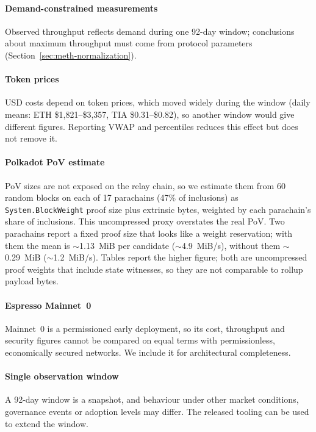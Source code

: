 \paragraph{Demand-constrained measurements}
Observed throughput reflects demand during one 92-day window; conclusions about maximum throughput must come from protocol parameters (Section~\ref{sec:meth-normalization}).

\paragraph{Token prices}
USD costs depend on token prices, which moved widely during the window (daily means: ETH \$1,821--\$3,357, TIA \$0.31--\$0.82), so another window would give different figures.
Reporting VWAP and percentiles reduces this effect but does not remove it.

\paragraph{Polkadot PoV estimate}
PoV sizes are not exposed on the relay chain, so we estimate them from 60 random blocks on each of 17 parachains (47\% of inclusions) as \texttt{System.BlockWeight} proof size plus extrinsic bytes, weighted by each parachain's share of inclusions. This uncompressed proxy overstates the real PoV. Two parachains report a fixed proof size that looks like a weight reservation; with them the mean is $\sim$1.13~MiB per candidate ($\sim$4.9~MiB/s), without them $\sim$0.29~MiB ($\sim$1.2~MiB/s). Tables report the higher figure; both are uncompressed proof weights that include state witnesses, so they are not comparable to rollup payload bytes.

\paragraph{Espresso Mainnet~0}
Mainnet~0 is a permissioned early deployment, so its cost, throughput and security figures cannot be compared on equal terms with permissionless, economically secured networks.
We include it for architectural completeness.

\paragraph{Single observation window}
A 92-day window is a snapshot, and behaviour under other market conditions, governance events or adoption levels may differ.
The released tooling can be used to extend the window.

